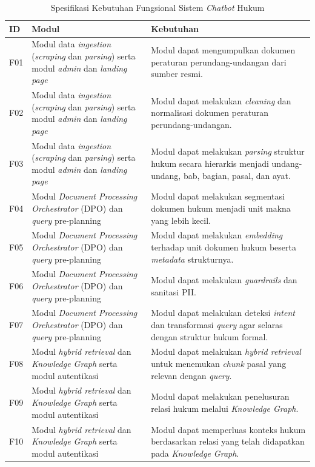 {\setlength{\tabcolsep}{4pt}
\begin{longtable}{|p{}|p{}|p{}|}
\caption{Spesifikasi Kebutuhan Fungsional Sistem \emph{Chatbot} Hukum}\label{tab:functional}\endfirsthead
\hline \textbf{ID} & \textbf{Modul} & \textbf{Kebutuhan} \\\hline
\endhead
\hline
F01 & Modul data \emph{ingestion} (\emph{scraping} dan \emph{parsing}) serta modul \emph{admin} dan \emph{landing page} & Modul dapat mengumpulkan dokumen peraturan perundang-undangan dari sumber resmi. \\\hline
F02 & Modul data \emph{ingestion} (\emph{scraping} dan \emph{parsing}) serta modul \emph{admin} dan \emph{landing page} & Modul dapat melakukan \emph{cleaning} dan normalisasi dokumen peraturan perundang-undangan. \\\hline
F03 & Modul data \emph{ingestion} (\emph{scraping} dan \emph{parsing}) serta modul \emph{admin} dan \emph{landing page} & Modul dapat melakukan \emph{parsing} struktur hukum secara hierarkis menjadi undang-undang, bab, bagian, pasal, dan ayat. \\\hline
F04 & Modul \emph{Document Processing Orchestrator} (DPO) dan \emph{query} pre-planning & Modul dapat melakukan segmentasi dokumen hukum menjadi unit makna yang lebih kecil. \\\hline
F05 & Modul \emph{Document Processing Orchestrator} (DPO) dan \emph{query} pre-planning & Modul dapat melakukan \emph{embedding} terhadap unit dokumen hukum beserta \emph{metadata} strukturnya. \\\hline
F06 & Modul \emph{Document Processing Orchestrator} (DPO) dan \emph{query} pre-planning & Modul dapat melakukan \emph{guardrails} dan sanitasi PII. \\\hline
F07 & Modul \emph{Document Processing Orchestrator} (DPO) dan \emph{query} pre-planning & Modul dapat melakukan deteksi \emph{intent} dan transformasi \emph{query} agar selaras dengan struktur hukum formal. \\\hline
F08 & Modul \emph{hybrid retrieval} dan \emph{Knowledge Graph} serta modul autentikasi & Modul dapat melakukan \emph{hybrid retrieval} untuk menemukan \emph{chunk} pasal yang relevan dengan \emph{query}. \\\hline
F09 & Modul \emph{hybrid retrieval} dan \emph{Knowledge Graph} serta modul autentikasi & Modul dapat melakukan penelusuran relasi hukum melalui \emph{Knowledge Graph}. \\\hline
F10 & Modul \emph{hybrid retrieval} dan \emph{Knowledge Graph} serta modul autentikasi & Modul dapat memperluas konteks hukum berdasarkan relasi yang telah didapatkan pada \emph{Knowledge Graph}. \\\hline

\end{longtable}}
